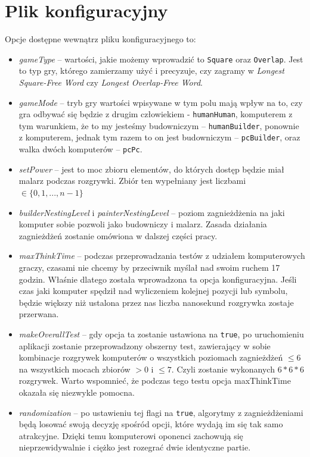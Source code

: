 \documentclass[document]{xmgr}
\begin{document}
\section{Plik konfiguracyjny}
Opcje dostępne wewnątrz pliku konfiguracyjnego to:
\begin{itemize}
\item \emph{gameType} -- wartości, jakie możemy wprowadzić to \texttt{Square} oraz \texttt{Overlap}. Jest to typ gry, którego zamierzamy użyć i precyzuje, czy zagramy w \emph{Longest Square-Free Word} czy \emph{Longest Overlap-Free Word}.
\item \emph{gameMode} -- tryb gry wartości wpisywane w tym polu mają wpływ na to, czy gra odbywać się będzie z drugim człowiekiem - \texttt{humanHuman}, komputerem z tym warunkiem, że to my jesteśmy budowniczym -- \texttt{humanBuilder}, ponownie z komputerem, jednak tym razem to on jest budowniczym -- \texttt{pcBuilder}, oraz walka dwóch komputerów -- \texttt{pcPc}.
\item \emph{setPower} -- jest to moc zbioru elementów, do których dostęp będzie miał malarz podczas rozgrywki. Zbiór ten wypełniany jest liczbami  $\in \{0, 1, ...,n-1\}$
\item \emph{builderNestingLevel} i \emph{painterNestingLevel} -- poziom zagnieżdżenia na jaki komputer sobie pozwoli jako budowniczy i malarz. Zasada działania zagnieżdżeń zostanie omówiona w dalszej części pracy.
\item \emph{maxThinkTime} -- podczas przeprowadzania testów z udziałem komputerowych graczy, czasami nie chcemy by przeciwnik myślał nad swoim ruchem 17 godzin. Właśnie dlatego została wprowadzona ta opcja konfiguracyjna. Jeśli czas jaki komputer spędził nad wyliczeniem kolejnej pozycji lub symbolu, będzie większy niż ustalona przez nas liczba nanosekund rozgrywka zostaje przerwana.
\item \emph{makeOverallTest} -- gdy opcja ta zostanie ustawiona na \texttt{true}, po uruchomieniu aplikacji zostanie przeprowadzony obszerny test, zawierający w sobie kombinacje rozgrywek komputerów o wszystkich poziomach zagnieżdżeń $\leq 6$ na wszystkich mocach zbiorów $>0 $ i $\leq 7$. Czyli zostanie wykonanych $6*6*6$ rozgrywek. Warto wspomnieć, że podczas tego testu opcja maxThinkTime okazała się niezwykle pomocna.
\item \emph{randomization} -- po ustawieniu tej flagi na \texttt{true}, algorytmy z zagnieżdżeniami będą losować swoją decyzję spośród opcji, które wydają im się tak samo atrakcyjne. Dzięki temu komputerowi oponenci zachowują się nieprzewidywalnie i ciężko jest rozegrać dwie identyczne partie.
\end{itemize}
\end{document}
